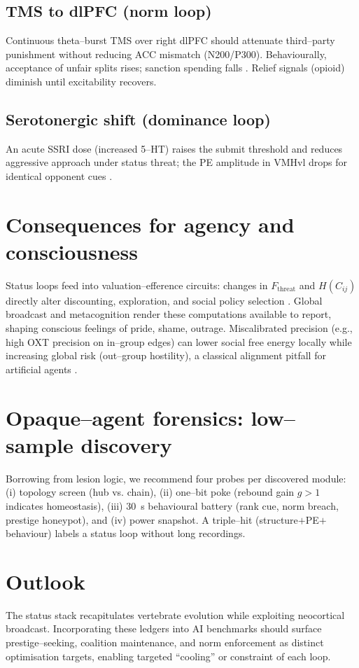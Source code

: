 \documentclass[11pt]{article}
\begin{document}
\subsection*{TMS to dlPFC (norm loop)}
Continuous theta--burst TMS over right dlPFC should attenuate third--party punishment without reducing ACC mismatch (N200/P300). Behaviourally, acceptance of unfair splits rises; sanction spending falls \cite{Knoch2006}. Relief signals (opioid) diminish until excitability recovers.

\subsection*{Serotonergic shift (dominance loop)}
An acute SSRI dose (increased 5--HT) raises the submit threshold and reduces aggressive approach under status threat; the PE amplitude in VMHvl drops for identical opponent cues \cite{Raleigh1991}.

\section{Consequences for agency and consciousness}
Status loops feed into valuation--efference circuits: changes in $F_{\mathrm{threat}}$ and $H(C_{ij})$ directly alter discounting, exploration, and social policy selection \cite{Daw2006}. Global broadcast and metacognition render these computations available to report, shaping conscious feelings of pride, shame, outrage. Miscalibrated precision (e.g., high OXT precision on in--group edges) can lower social free energy locally while increasing global risk (out--group hostility), a classical alignment pitfall for artificial agents \citep{zarncke2025attractor}.

\section{Opaque--agent forensics: low--sample discovery}
Borrowing from lesion logic, we recommend four probes per discovered module: (i) topology screen (hub vs. chain), (ii) one--bit poke (rebound gain $g>1$ indicates homeostasis), (iii) 30~s behavioural battery (rank cue, norm breach, prestige honeypot), and (iv) power snapshot. A triple--hit (structure$+$PE$+$behaviour) labels a status loop without long recordings.

\section{Outlook}
The status stack recapitulates vertebrate evolution while exploiting neocortical broadcast. Incorporating these ledgers into AI benchmarks should surface prestige--seeking, coalition maintenance, and norm enforcement as distinct optimisation targets, enabling targeted ``cooling'' or constraint of each loop.
\end{document}
